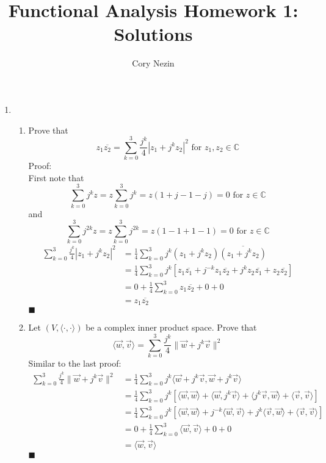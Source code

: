 \documentclass[12pt]{article}
\title{Functional Analysis Homework 1: Solutions}
\author{Cory Nezin}
\begin{document}
\maketitle
\begin{enumerate}
\item
\begin{enumerate}
\item Prove that
$$ z_1\overline{z_2} = \sum_{k=0}^3 \frac{j^k}{4}|z_1 + j^kz_2|^2 \text{ for } 
z_1,z_2 \in \mathbb{C}$$
Proof:\\
First note that 
$$\sum_{k=0}^3 j^k z = z\sum_{k=0}^3j^k = z(1 + j -1 -j) = 0 \text{ for } z \in \mathbb{C}$$
and
$$\sum_{k=0}^3 j^{2k} z = z\sum_{k=0}^3j^{2k} = z(1 -1 +1 -1) = 0 \text{ for } z \in \mathbb{C}$$
\begin{align*}
\sum_{k=0}^3 \frac{j^k}{4}|z_1 + j^kz_2|^2 &= \frac{1}{4}\sum_{k=0}^3 j^k (z_1+j^kz_2)\overline{(z_1+j^kz_2)}\\
&= \frac{1}{4}\sum_{k=0}^3 j^k [z_1\overline{z_1} + j^{-k}z_1\overline{z_2} + j^kz_2\overline{z_1} + z_2\overline{z_2}]\\
&= 0 + \frac{1}{4}\sum_{k=0}^3 z_1\overline{z_2} + 0 + 0\\
&= z_1\overline{z_2}
\end{align*}
$\blacksquare$
\item Let $(V,\langle\cdot,\cdot\rangle)$ be a complex inner product space.  Prove that\\
$$\langle \vec{w},\vec{v}\rangle = \sum_{k=0}^3 \frac{j^k}{4} \lVert \vec{w} + 
j^k\vec{v}\rVert^2$$
Similar to the last proof:
\begin{align*}
\sum_{k=0}^3 \frac{j^k}{4}\lVert \vec{w} + j^k\vec{v}\rVert^2 &= \frac{1}{4}\sum_{k=0}^3 j^k \langle \vec{w}+j^k\vec{v},\vec{w}+j^k\vec{v}\rangle\\
&= \frac{1}{4}\sum_{k=0}^3 j^k [\langle \vec{w},\vec{w} \rangle + \langle \vec{w},j^k\vec{v} \rangle + \langle j^k\vec{v},\vec{w} \rangle + \langle \vec{v}, \vec{v} \rangle]\\
&= \frac{1}{4}\sum_{k=0}^3 j^k [\langle \vec{w},\vec{w} \rangle + j^{-k}\langle \vec{w},\vec{v} \rangle + j^k \langle \vec{v},\vec{w} \rangle + \langle \vec{v}, \vec{v} \rangle]\\
&= 0 + \frac{1}{4}\sum_{k=0}^3 \langle \vec{w},\vec{v} \rangle + 0 + 0\\
&= \langle \vec{w},\vec{v} \rangle
\end{align*}
$\blacksquare$
\end{enumerate}
\end{enumerate}
\end{document}
